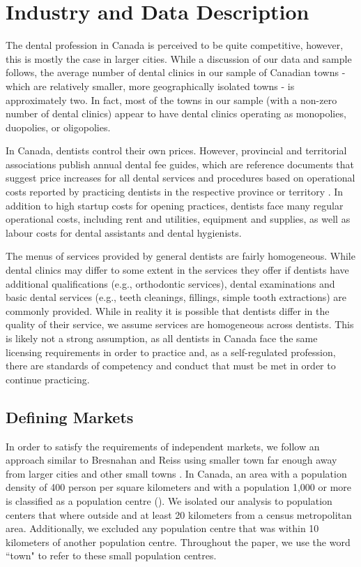\documentclass[a4paper,11pt]{article}
\begin{document}
\section{Industry and Data Description}
The dental profession in Canada is perceived to be quite competitive, however, this is mostly the case in larger cities. While a discussion of our data and sample follows, the average number of dental clinics in our sample of Canadian towns - which are relatively smaller, more geographically isolated towns - is approximately two. In fact, most of the towns in our sample (with a non-zero number of dental clinics) appear to have dental clinics operating as monopolies, duopolies, or oligopolies.

In Canada, dentists control their own prices. However, provincial and territorial associations publish annual dental fee guides, which are reference documents that suggest price increases for all dental services and procedures based on operational costs reported by practicing dentists in the respective province or territory \citep{Rolfe}. In addition to high startup costs for opening practices, dentists face many regular operational costs, including rent and utilities, equipment and supplies, as well as labour costs for dental assistants and dental hygienists.

The menus of services provided by general dentists are fairly homogeneous. While dental clinics may differ to some extent in the services they offer if dentists have additional qualifications (e.g., orthodontic services), dental examinations and basic dental services (e.g., teeth cleanings, fillings, simple tooth extractions) are commonly provided. While in reality it is possible that dentists differ in the quality of their service, we assume services are homogeneous across dentists. This is likely not a strong assumption, as all dentists in Canada face the same licensing requirements in order to practice and, as a self-regulated profession, there are standards of competency and conduct that must be met in order to continue practicing.

\subsection{Defining Markets}

In order to satisfy the requirements of independent markets, we follow an approach similar to Bresnahan and Reiss using smaller town far enough away from larger cities and other small towns \citep{BresReiss}. In Canada, an area with a population density of 400 person per square kilometers and with a population 1,000 or more is classified as a population centre (\cite{popCenter}). We isolated our analysis to population centers that where outside and at least 20 kilometers from a census metropolitan area. Additionally, we excluded any population centre that was within 10 kilometers of another population centre. Throughout the paper, we use the word ``town" to refer to these small population centres. 
\end{document}
